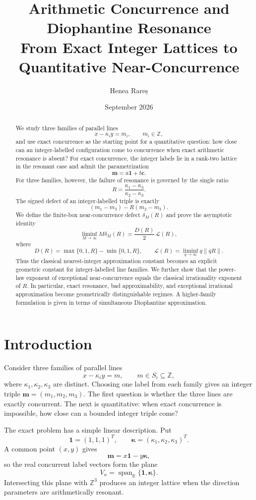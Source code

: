 \documentclass[11pt,a4paper]{article}
\title{\textbf{Arithmetic Concurrence and Diophantine Resonance}\\
\large From Exact Integer Lattices to Quantitative Near-Concurrence}
\author{Henea Rareș}
\date{September 2026}
\begin{document}
\maketitle

\begin{abstract}
We study three families of parallel lines
\[
x-\kappa_i y=m_i,\qquad m_i\in\mathbb Z,
\]
and use exact concurrence as the starting point for a quantitative question: how close can an
integer-labelled configuration come to concurrence when exact arithmetic resonance is absent?
For exact concurrence, the integer labels lie in a rank-two lattice in the resonant case and admit
the parametrization
\[
\mathbf m=a\mathbf 1+t\mathbf c.
\]
For three families, however, the failure of resonance is governed by the single ratio
\[
R=\frac{\kappa_1-\kappa_3}{\kappa_2-\kappa_3}.
\]
The signed defect of an integer-labelled triple is exactly
\[
(m_1-m_3)-R(m_2-m_3).
\]
We define the finite-box near-concurrence defect $\delta_M(R)$ and prove the asymptotic identity
\[
\liminf_{M\to\infty}M\delta_M(R)=\frac{D(R)}2\,\mathcal L(R),
\]
where
\[
D(R)=\max\{0,1,R\}-\min\{0,1,R\},
\qquad
\mathcal L(R)=\liminf_{q\to\infty}q\|qR\|.
\]
Thus the classical nearest-integer approximation constant becomes an explicit geometric constant for
integer-labelled line families. We further show that the power-law exponent of exceptional
near-concurrence equals the classical irrationality exponent of $R$. In particular, exact
resonance, bad approximability, and exceptional irrational approximation become geometrically
distinguishable regimes. A higher-family formulation is given in terms of simultaneous
Diophantine approximation.
\end{abstract}

\clearpage
\tableofcontents
\clearpage

\section{Introduction}

Consider three families of parallel lines
\[
x-\kappa_i y=m,\qquad m\in S_i\subseteq\mathbb Z,
\]
where $\kappa_1,\kappa_2,\kappa_3$ are distinct. Choosing one label from each family gives an
integer triple $\mathbf m=(m_1,m_2,m_3)$. The first question is whether the three lines are exactly concurrent. The next is quantitative: when exact concurrence is impossible, how close can a bounded integer triple come?

The exact problem has a simple linear description. Put
\[
\mathbf 1=(1,1,1)^T,\qquad
\boldsymbol\kappa=(\kappa_1,\kappa_2,\kappa_3)^T.
\]
A common point $(x,y)$ gives
\[
\mathbf m=x\mathbf1-y\boldsymbol\kappa,
\]
so the real concurrent label vectors form the plane
\[
V_\kappa=\operatorname{span}_{\mathbb R}\{\mathbf1,\boldsymbol\kappa\}.
\]
Intersecting this plane with $\mathbb Z^3$ produces an integer lattice when the direction
parameters are arithmetically resonant.
\end{document}
